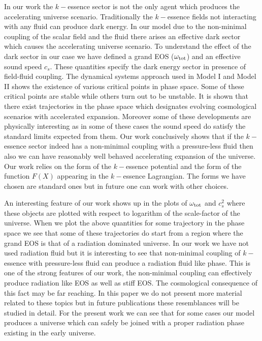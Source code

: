 \documentclass[a4paper,12pt]{article}
\begin{document}
In our work the $k-$essence sector is not the only agent which produces the accelerating universe scenario. Traditionally the $k-$essence fields not interacting with any fluid can produce dark energy. In our model due to the non-minimal coupling of the scalar field and the fluid there arises an effective dark sector which causes the accelerating universe scenario. To understand the effect of the dark sector in our case we have defined a grand EOS ($\omega_{\rm tot}$) and an effective sound speed $c_s$. These quantities specify the dark energy sector in presence of field-fluid coupling. The dynamical systems approach used in Model I and Model II shows the existence of various critical points in phase space. Some of these critical points are stable while others turn out to be unstable. It is shown that there exist trajectories in the phase space which designates evolving cosmological scenarios with accelerated expansion. Moreover some of these developments are physically interesting as in some of these cases the sound speed do satisfy the standard limits expected from them. Our work conclusively shows that if the $k-$essence sector indeed has a non-minimal coupling with a pressure-less fluid then also we can have reasonably well behaved accelerating expansion of the universe. Our work relies on the form of the $k-$essence potential and the form of the function $F(X)$ appearing in the $k-$essence Lagrangian. The forms we have chosen are standard ones but in future one can work with other choices.

An interesting feature of our work shows up in the plots of $\omega_{\rm tot}$ and $c_s^2$ where these objects are plotted with respect to logarithm of the scale-factor of the universe. When we plot the above quantities for some trajectory in the phase space we see that some of these trajectories do start from a region where the grand EOS is that of a radiation dominated universe. In our work we have not used radiation fluid but it is interesting to see that non-minimal coupling of $k-$essence with pressure-less fluid can produce a radiation fluid like phase. This is one of the strong features of our work, the non-minimal coupling can effectively produce radiation like EOS as well as stiff EOS. The cosmological consequence of this fact may be far reaching. In this paper we do not present more material related to these topics but in future publications these resemblances will be studied in detail. For the present work we can see that for some cases our model produces a universe which can safely be joined with a proper radiation phase existing in the early universe.   
\end{document}
